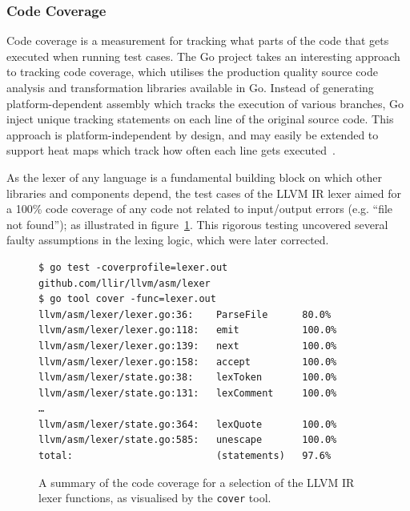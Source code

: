 
\subsubsection{Code Coverage}
\label{sec:ver_code_coverage}

Code coverage is a measurement for tracking what parts of the code that gets executed when running test cases. The Go project takes an interesting approach to tracking code coverage, which utilises the production quality source code analysis and transformation libraries available in Go. Instead of generating platform-dependent assembly which tracks the execution of various branches, Go inject unique tracking statements on each line of the original source code. This approach is platform-independent by design, and may easily be extended to support heat maps which track how often each line gets executed~\cite{go_cover}.

As the lexer of any language is a fundamental building block on which other libraries and components depend, the test cases of the LLVM IR lexer aimed for a 100\% code coverage of any code not related to input/output errors (e.g. ``file not found''); as illustrated in figure~\ref{fig:lexer_code_coverage}. This rigorous testing uncovered several faulty assumptions in the lexing logic, which were later corrected.

\begin{figure}[htbp]
	\begin{center}
		\begin{verbatim}
$ go test -coverprofile=lexer.out github.com/llir/llvm/asm/lexer
$ go tool cover -func=lexer.out
llvm/asm/lexer/lexer.go:36:    ParseFile      80.0%
llvm/asm/lexer/lexer.go:118:   emit           100.0%
llvm/asm/lexer/lexer.go:139:   next           100.0%
llvm/asm/lexer/lexer.go:158:   accept         100.0%
llvm/asm/lexer/state.go:38:    lexToken       100.0%
llvm/asm/lexer/state.go:131:   lexComment     100.0%
…
llvm/asm/lexer/state.go:364:   lexQuote       100.0%
llvm/asm/lexer/state.go:585:   unescape       100.0%
total:                         (statements)   97.6%
		\end{verbatim}
		\caption{A summary of the code coverage for a selection of the LLVM IR lexer functions, as visualised by the \texttt{cover} tool.}
		\label{fig:lexer_code_coverage}
	\end{center}
\end{figure}

